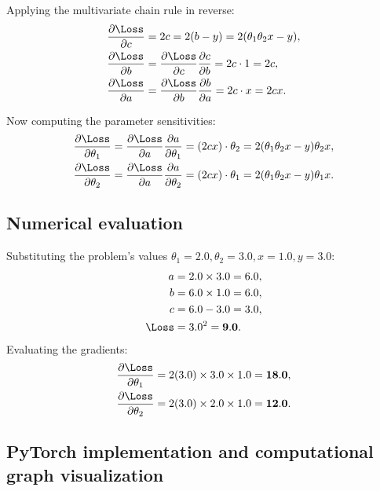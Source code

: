 \documentclass[../labs.tex]{subfiles}
\begin{document}
Applying the multivariate chain rule in reverse:
\begin{align}
\frac{\partial \Loss}{\partial c} &= 2c = 2(b - y) = 2(\theta_1 \theta_2 x - y), \\
\frac{\partial \Loss}{\partial b} &= \frac{\partial \Loss}{\partial c} \frac{\partial c}{\partial b} = 2c \cdot 1 = 2c, \\
\frac{\partial \Loss}{\partial a} &= \frac{\partial \Loss}{\partial b} \frac{\partial b}{\partial a} = 2c \cdot x = 2cx.
\end{align}

Now computing the parameter sensitivities:
\begin{align}
\label{eq:analytical_theta1}
\frac{\partial \Loss}{\partial \theta_1} &= \frac{\partial \Loss}{\partial a} \frac{\partial a}{\partial \theta_1} = (2cx) \cdot \theta_2 = 2(\theta_1 \theta_2 x - y) \theta_2 x, \\
\label{eq:analytical_theta2}
\frac{\partial \Loss}{\partial \theta_2} &= \frac{\partial \Loss}{\partial a} \frac{\partial a}{\partial \theta_2} = (2cx) \cdot \theta_1 = 2(\theta_1 \theta_2 x - y) \theta_1 x.
\end{align}

\subsection{Numerical evaluation}
Substituting the problem's values $\theta_1 = 2.0, \theta_2 = 3.0, x = 1.0, y = 3.0$:
\begin{align}
a &= 2.0 \times 3.0 = 6.0, \\
b &= 6.0 \times 1.0 = 6.0, \\
c &= 6.0 - 3.0 = 3.0, \\
\Loss &= 3.0^2 = \mathbf{9.0}.
\end{align}
Evaluating the gradients:
\begin{align}
\frac{\partial \Loss}{\partial \theta_1} &= 2(3.0) \times 3.0 \times 1.0 = \mathbf{18.0}, \\
\frac{\partial \Loss}{\partial \theta_2} &= 2(3.0) \times 2.0 \times 1.0 = \mathbf{12.0}.
\end{align}

\subsection{PyTorch implementation and computational graph visualization}
\end{document}
